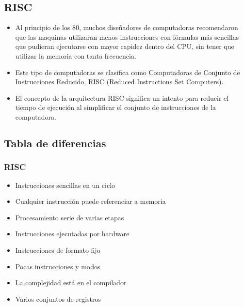 \documentclass[11pt]{article}
\begin{document}
\subsection{RISC}
\label{sec:orgb5f9206}
\begin{itemize}
\item Al principio de los 80, muchos diseñadores de computadoras recomendaron que las maquinas utilizaran menos instrucciones con fórmulas más sencillas que pudieran ejecutarse con mayor rapidez dentro del CPU, sin tener que utilizar la memoria con tanta frecuencia.

\item Este tipo de computadoras se clasifica como Computadoras de Conjunto de Instrucciones Reducido, RISC (Reduced Instructions Set Computers).

\item El concepto de la arquitectura RISC significa un intento para reducir el tiempo de ejecución al simplificar el conjunto de instrucciones de la computadora.
\end{itemize}

\subsection{Tabla de diferencias}
\label{sec:org98ef92f}
\subsubsection*{RISC}
\label{sec:org619e519}
\begin{mdframed}
\begin{itemize}
\item Instrucciones sencillas en un ciclo
\item Cualquier instrucción puede referenciar a memoria
\item Procesamiento serie de varias etapas
\item Instrucciones ejecutadas por hardware
\item Instrucciones de formato fijo
\item Pocas instrucciones y modos
\item La complejidad está en el compilador
\item Varios conjuntos de registros
\end{itemize}
\end{mdframed}
\end{document}
